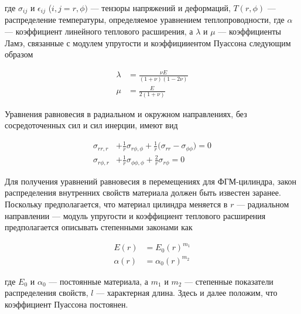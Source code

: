 где \(\sigma_{ij}\) и \(\epsilon_{ij}\) (\(i,j = r,\phi)\) --- тензоры напряжений и деформаций, \(T(r, \phi) \) --- распределение температуры, определяемое уравнением теплопроводности, где \(\alpha \) --- коэффициент линейного теплового расширения, а \( \lambda \) и \(\mu \) --- коэффициенты Ламэ, связанные с модулем упругости и коэффицииентом Пуассона следующим образом

\begin{equation}
	\label{eq:ch2:equation3}
	\begin{split}
		\lambda &= \frac{\nu E} {\left ( 1+\nu \right ) \left ( 1-2\nu \right ) } \\
		\mu&= \frac{E}{2 \left( 1+\nu \right ) }
	\end{split}
\end{equation}

Уравнения равновесия в радиальном и окружном направлениях, без сосредоточенных сил и сил инерции, имеют вид


\begin{equation}
	\label{eq:ch2:equation4}
	\begin{split}
		\sigma_{rr,r} &+ \frac{1}{r} \sigma_{r \phi, \phi} + \frac{1}{r} \big ( \sigma_{rr} - \sigma_{\phi\phi}\big ) = 0 \\
		\sigma_{r \phi, r} &+ \frac{1}{r} \sigma_{\phi \phi, \phi} + \frac{2}{r} \sigma_{r \phi} = 0
	\end{split}
\end{equation}


Для получения уравнений равновесия в перемещениях
для ФГМ-цилиндра, закон распределения внутренних свойств материала должен быть известен заранее. Поскольку предполагается, что материал цилиндра меняется в \(r\) --- радиальном направлении --- модуль упругости и коэффициент теплового расширения предполагается описывать степенными законами как

\begin{equation}
	\label{eq:ch2:equation5}
	\begin{split}
		E(r) &= E_0 \left ( r \right ) ^ {m_1} \\
		\alpha (r) &= \alpha_0 \left( r \right ) ^{ m_2}
	\end{split}
\end{equation}

где \(E_0\) и \(\alpha_0 \) --- постоянные материала, а \(m_1\) и \(m_2\) --- степенные показатели распределения свойств, \(l\) --- характерная длина. Здесь и далее положим,
что коэффициент Пуассона постоянен.

